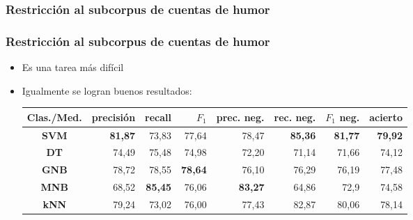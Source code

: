 \subsubsection{Restricción al subcorpus de cuentas de humor}
\begin{frame}
    \frametitle{Restricción al subcorpus de cuentas de humor}

    \begin{itemize}[<+->]
        \item Es una tarea más difícil
        \item Igualmente se logran buenos resultados:

        \begin{center}
            \scriptsize
            \begin{tabular}{ c | r | r | r | r | r | r | r }
                \textbf{Clas./Med.} & precisión & recall & $F_1$ & prec. neg. & rec. neg. & $F_1$ neg. & acierto \\
                \hline
                \textbf{SVM} & \textbf{81,87} & 73,83 & 77,64 & 78,47 & \textbf{85,36} & \textbf{81,77} & \textbf{79,92} \\
                \hline
                \textbf{DT} & 74,49 & 75,48 & 74,98 & 72,20 & 71,14 & 71,66 & 74,12 \\
                \hline
                \textbf{GNB} & 78,72 & 78,55 & \textbf{78,64} & 76,10 & 76,29 & 76,19 & 77,48 \\
                \hline
                \textbf{MNB} & 68,52 & \textbf{85,45} & 76,06 & \textbf{83,27} & 64,86 & 72,9 & 74,58 \\
                \hline
                \textbf{kNN} & 79,24 & 73,02 & 76,00 & 77,43 & 82,87 & 80,06 & 78,14 \\
            \end{tabular}
        \end{center}
    \end{itemize}
\end{frame}


